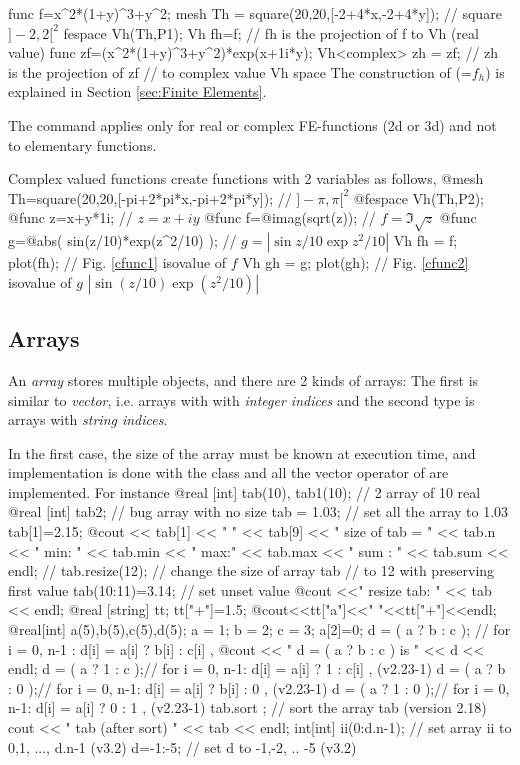 \documentclass[a4paper,twoside,12pt]{book}
\def\refSec#1{Section \ref{sec:#1}}
\begin{document}
\bFF
func f=x^2*(1+y)^3+y^2;
mesh Th = square(20,20,[-2+4*x,-2+4*y]); // square $]-2,2[^2$
fespace Vh(Th,P1);
Vh fh=f;  // fh is the  projection of f to Vh (real value)
func zf=(x^2*(1+y)^3+y^2)*exp(x+1i*y);
Vh<complex> zh = zf; // zh is the projection of zf
// to complex value Vh space   
\eFF
The construction of  (=$f_h$) is explained in
\refSec{Finite Elements}.

\begin{note}
The command  applies only for real or complex   FE-functions (2d or 3d) and not to elementary functions.
\end{note}
Complex valued functions create functions with 2 variables  as follows,
\bFF
@mesh Th=square(20,20,[-pi+2*pi*x,-pi+2*pi*y]); // $]-\pi,\pi[^2$
@fespace Vh(Th,P2);
@func z=x+y*1i;  // $z=x+iy$
@func f=@imag(sqrt(z));  // $f=\Im\sqrt{z}$
@func g=@abs( sin(z/10)*exp(z^2/10) ); // $g=|\sin z/10\exp z^2/10|$
Vh fh = f; plot(fh);  // Fig. \ref{cfunc1} isovalue of $f$
Vh gh = g; plot(gh);  // Fig. \ref{cfunc2} isovalue of $g$
\eFF
{}
{$|\sin (z/10)\exp (z^2/10)|$}

\subsection{Arrays}
An \emph{array} stores multiple objects, and
there are 2 kinds of arrays:
The first is similar to \emph{vector}, i.e. arrays with with \emph{integer indices}
and the second type is
arrays with \emph{string indices}.

In the first case, the size of the array
must be known at execution time, and implementation is done
with the  class and all the vector operator of
  are implemented. For instance
\bFF
@real [int] tab(10), tab1(10); // 2 array of 10 real
@real [int] tab2;    //  bug array with no size
tab = 1.03;                //  set all the array to 1.03
tab[1]=2.15;
@cout << tab[1] << " " << tab[9] << " size of tab = "
     << tab.n << " min: " << tab.min << "  max:" << tab.max
     << " sum : "   << tab.sum <<   endl; //
tab.resize(12); //  change the size of array tab
  // to 12 with preserving first value
tab(10:11)=3.14; //  set unset value
@cout <<" resize tab: " <<  tab << endl;
@real [string] tt;
tt["+"]=1.5;
@cout<<tt["a"]<<"  "<<tt["+"]<<endl;
@real[int]  a(5),b(5),c(5),d(5);
a = 1;
b = 2;
c = 3;
a[2]=0;
d = ( a ? b : c ); // for i = 0, n-1  : d[i] = a[i] ? b[i] : c[i] ,
@cout << " d = ( a ? b : c )  is " << d << endl;
d = ( a ? 1 : c );// for i = 0, n-1: d[i] = a[i] ? 1 : c[i] ,  \hfill (v2.23-1)
d = ( a ? b : 0 );// for i = 0, n-1: d[i] = a[i] ? b[i] : 0 ,  \hfill (v2.23-1)
d = ( a ? 1 : 0 );// for i = 0, n-1: d[i] = a[i] ? 0 : 1 ,     \hfill(v2.23-1)
tab.sort ; //  sort the array tab  (version 2.18)
cout << " tab (after sort) "  << tab << endl;
int[int] ii(0:d.n-1); // set array ii to 0,1, ..., d.n-1 \hfill (v3.2)
d=-1:-5; // set d to  -1,-2, .. -5 \hfill (v3.2)
\end{document}
